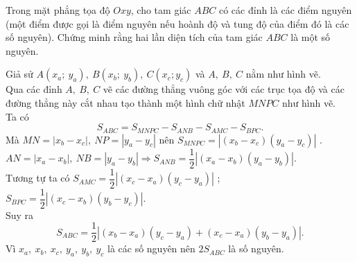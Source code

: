 \begin{ex}%
Trong mặt phẳng tọa độ $Oxy$, cho tam giác $ABC$ có các đỉnh là các điểm nguyên (một điểm được gọi là điểm nguyên nếu hoành độ và tung độ của điểm đó là các số nguyên). Chứng minh rằng hai lần diện tích của tam giác $ABC$ là một số nguyên.
\loigiai
    {
     \begin{center}
    \end{center}
    Giả sử $A\left({x_a;\ y_a}\right),\  B\left({x_b;\ y _b}\right),\ C\left({x_c;y_c}\right)$ và $A,\ B,\ C$ nằm như hình vẽ. \\
Qua các đỉnh $A,\ B,\ C$ vẽ các đường thẳng vuông góc với các trục tọa độ và các đường thẳng này cắt nhau tạo thành một hình chữ nhật $MNPC$ như hình vẽ.\\
Ta có $$S_{ABC}=S_{MNPC}-S_{ANB}-S_{AMC}-S_{BPC}.$$
Mà $MN=\left|{x_b-x_c}\right|,\ NP=\left|y_a-y_c\right|$ nên $S_{MNPC}=\left|\left(x_b-x_c\right)\left(y_a-y_c\right)\right|$ .\\
$AN=\left|{x_a-x_b}\right|,\ NB=\left|{y_a-y_b}\right|\Rightarrow S_{ANB}=\dfrac12\left|{\left({x_a-x_b}\right)\left({y_a-y_b}\right)}\right|$.\\
Tương tự ta có
$S_{AMC}=\dfrac12\left|{\left({x_c-x_a}\right)\left({y_c-y_a}\right)}\right|$ ; $S_{BPC}=\dfrac12\left|{\left({x_c-x_b}\right)\left({y_b-y_c}\right)}\right|$.\\
Suy ra $$S_{ABC}=\dfrac12\left|{\left({x_b-x_a}\right)\left({y_c-y_a}\right)+\left({x_c-x_a}\right)\left({y_b-y_a}\right)}\right|.$$
Vì $x_a,\ x_b,\ x_c,\ y_a,\ y_b,\ y_c$ là các số nguyên nên $2S_{ABC}$ là số nguyên.
    }
\end{ex}

